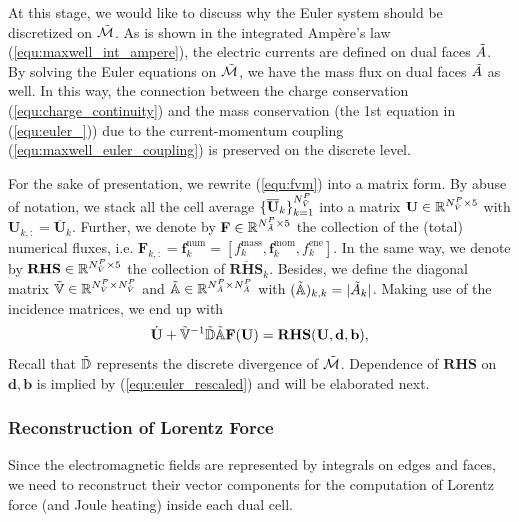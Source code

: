 \documentclass{article}
\begin{document}
At this stage, we would like to discuss why the Euler system should be discretized on $\Tilde{\mathcal{M}}$. As is shown in the integrated Amp\`{e}re's law (\ref{equ:maxwell_int_ampere}), the electric currents are defined on dual faces $\Tilde{A}$. By solving the Euler equations on $\Tilde{\mathcal{M}}$, we have the mass flux on dual faces $\Tilde{A}$ as well. In this way, the connection between the charge conservation (\ref{equ:charge_continuity}) and the mass conservation (the 1st equation in (\ref{equ:euler_})) due to the current-momentum coupling (\ref{equ:maxwell_euler_coupling}) is preserved on the discrete level. 

For the sake of presentation, we rewrite (\ref{equ:fvm}) into a matrix form. By abuse of notation, we stack all the cell average $\{\overline{\mathbf{U}}_k\}_{k=1}^{N^P_{\Tilde{V}}}$ into a matrix $\mathbf{U} \in \mathbb{R}^{N_{\Tilde{V}}^P \times 5}$ with $\mathbf{U}_{k,:} = \overline{\mathbf{U}}_k$. Further, we denote by $\mathbf{F} \in \mathbb{R}^{N_{\Tilde{A}}^P \times 5}$ the collection of the (total) numerical fluxes, i.e. $\mathbf{F}_{k,:} = \mathbf{f}^\text{num}_k = [f^\text{mass}_k, \bm{f}^\text{mom}_k, f^\text{ene}_k]$. In the same way, we denote by $\mathbf{RHS}\in \mathbb{R}^{N_{\Tilde{V}}^P \times 5}$ the collection of $\overline{\mathbf{RHS}}_k$. Besides, we define the diagonal matrix $\mathbb{\Tilde{V}} \in \mathbb{R}^{N_{\Tilde{V}}^P \times N_{\Tilde{V}}^P}$ and $\mathbb{\Tilde{A}}\in \mathbb{R}^{N_{\Tilde{A}}^P \times N_{\Tilde{A}}^P}$ with $(\mathbb{\Tilde{A}})_{k,k} = |\Tilde{A}_k|$. Making use of the incidence matrices, we end up with
\begin{equation} \label{equ:euler_matrix_form}
    \dot{\mathbf{U}} + \mathbb{\Tilde{V}}^{-1}\mathbb{\Tilde{D}}\mathbb{\Tilde{A}}\mathbf{F}(\mathbf{U})  = \mathbf{RHS}(\mathbf{U},\mathbf{d},\mathbf{b}),
\end{equation}
Recall that $\Tilde{\mathbb{D}}$ represents the discrete divergence of $\Tilde{\mathcal{M}}$. Dependence of $\mathbf{RHS}$ on $\mathbf{d}, \mathbf{b}$ is implied by (\ref{equ:euler_rescaled}) and will be elaborated next.

\subsubsection{Reconstruction of Lorentz Force}
Since the electromagnetic fields are represented by integrals on edges and faces, we need to reconstruct their vector components for the computation of Lorentz force (and Joule heating) inside each dual cell.    
\end{document}
